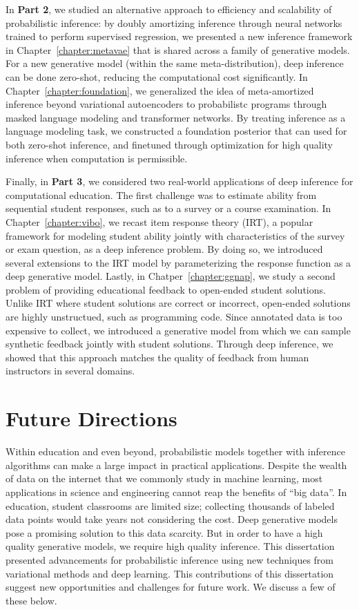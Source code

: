 In \textbf{Part 2}, we studied an alternative approach to efficiency and scalability of probabilistic inference: by doubly amortizing inference through neural networks trained to perform supervised regression, we presented a new inference framework in Chapter~\ref{chapter:metavae} that is shared across a family of generative models. For a new generative model (within the same meta-distribution), deep inference can be done zero-shot, reducing the computational cost significantly. In Chapter~\ref{chapter:foundation}, we generalized the idea of meta-amortized inference beyond variational autoencoders to probabilistc programs through masked language modeling and transformer networks. By treating inference as a language modeling task, we constructed a foundation posterior that can used for both zero-shot inference, and finetuned through optimization for high quality inference when computation is permissible.

Finally, in \textbf{Part 3}, we considered two real-world applications of deep inference for computational education. The first challenge was to estimate ability from sequential student responses, such as to a survey or a course examination. In Chapter~\ref{chapter:vibo}, we recast item response theory (IRT), a popular framework for modeling student ability jointly with characteristics of the survey or exam question, as a deep inference problem. By doing so, we introduced several extensions to the IRT model by parameterizing the response function as a deep generative model. Lastly, in Chatper~\ref{chapter:ggnap}, we study a second problem of providing educational feedback to open-ended student solutions. Unlike IRT where student solutions are correct or incorrect, open-ended solutions are highly unstructued, such as programming code. Since annotated data is too expensive to collect, we introduced a generative model from which we can sample synthetic feedback jointly with student solutions. Through deep inference, we showed that this approach matches the quality of feedback from human instructors in several domains.

\section{Future Directions}

Within education and even beyond, probabilistic models together with inference algorithms can make a large impact in practical applications. Despite the wealth of data on the internet that we commonly study in machine learning, most applications in science and engineering cannot reap the benefits of ``big data''. In education, student classrooms are limited size; collecting thousands of labeled data points would take years not considering the cost. Deep generative models pose a promising solution to this data scarcity. But in order to have a high quality generative models, we require high quality inference. This dissertation presented advancements for probabilistic inference using new techniques from variational methods and deep learning. This contributions of this dissertation suggest new opportunities and challenges for future work. We discuss a few of these below.\newline

